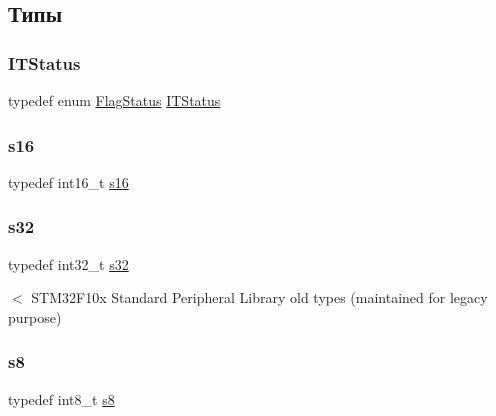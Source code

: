 \subsection{Типы}
\mbox{\label{group___exported__types_gaacbd7ed539db0aacd973a0f6eca34074}} 
\subsubsection{\texorpdfstring{ITStatus}{ITStatus}}
{\footnotesize\ttfamily typedef  enum \mbox{\hyperlink{group___exported__types_ga89136caac2e14c55151f527ac02daaff}{Flag\+Status}}  \mbox{\hyperlink{group___exported__types_gaacbd7ed539db0aacd973a0f6eca34074}{I\+T\+Status}}}

\mbox{\label{group___exported__types_gaa980e2c02ba2305e0f489d5650655425}} 
\subsubsection{\texorpdfstring{s16}{s16}}
{\footnotesize\ttfamily typedef int16\+\_\+t \mbox{\hyperlink{group___exported__types_gaa980e2c02ba2305e0f489d5650655425}{s16}}}

\mbox{\label{group___exported__types_gae9b1af5c037e57a98884758875d3a7c4}} 
\subsubsection{\texorpdfstring{s32}{s32}}
{\footnotesize\ttfamily typedef int32\+\_\+t \mbox{\hyperlink{group___exported__types_gae9b1af5c037e57a98884758875d3a7c4}{s32}}}

$<$ S\+T\+M32\+F10x Standard Peripheral Library old types (maintained for legacy purpose) \mbox{\label{group___exported__types_ga9e382f207c65ca13ab4ae98363aeda80}} 
\subsubsection{\texorpdfstring{s8}{s8}}
{\footnotesize\ttfamily typedef int8\+\_\+t \mbox{\hyperlink{group___exported__types_ga9e382f207c65ca13ab4ae98363aeda80}{s8}}}

